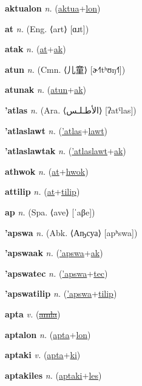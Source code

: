 \textbf{\hypertarget{aktualon}{aktualon}} \textit{n.} (\hyperlink{aktua}{aktua}+\allowbreak \hyperlink{lon}{lon})


\textbf{\hypertarget{at}{at}} \textit{n.} (Eng. ⟨art⟩ [ɑɹt])


\textbf{\hypertarget{atak}{atak}} \textit{n.} (\hyperlink{at}{at}+\allowbreak \hyperlink{ak}{ak})


\textbf{\hypertarget{atun}{atun}} \textit{n.} (Cmn. ⟨{\chinese{}儿童}⟩ [ɚ˧˥tʰʊŋ˧˥])


\textbf{\hypertarget{atunak}{atunak}} \textit{n.} (\hyperlink{atun}{atun}+\allowbreak \hyperlink{ak}{ak})


\textbf{\hypertarget{'atlas}{'atlas}} \textit{n.} (Ara. ⟨{\arabics{}الأطـلـس‎}⟩ [ʔatˤlas])


\textbf{\hypertarget{'atlaslawt}{'atlaslawt}} \textit{n.} (\hyperlink{'atlas}{'atlas}+\allowbreak \hyperlink{lawt}{lawt})


\textbf{\hypertarget{'atlaslawtak}{'atlaslawtak}} \textit{n.} (\hyperlink{'atlaslawt}{'atlaslawt}+\allowbreak \hyperlink{ak}{ak})


\textbf{\hypertarget{athwok}{athwok}} \textit{n.} (\hyperlink{at}{at}+\allowbreak \hyperlink{hwok}{hwok})


\textbf{\hypertarget{attilip}{attilip}} \textit{n.} (\hyperlink{at}{at}+\allowbreak \hyperlink{tilip}{tilip})


\textbf{\hypertarget{ap}{ap}} \textit{n.} (Spa. ⟨ave⟩ [ˈaβe])


\textbf{\hypertarget{'apswa}{'apswa}} \textit{n.} (Abk. ⟨Аҧсуа⟩ [apʰswa])


\textbf{\hypertarget{'apswaak}{'apswaak}} \textit{n.} (\hyperlink{'apswa}{'apswa}+\allowbreak \hyperlink{ak}{ak})


\textbf{\hypertarget{'apswatec}{'apswatec}} \textit{n.} (\hyperlink{'apswa}{'apswa}+\allowbreak \hyperlink{tec}{tec})


\textbf{\hypertarget{'apswatilip}{'apswatilip}} \textit{n.} (\hyperlink{'apswa}{'apswa}+\allowbreak \hyperlink{tilip}{tilip})


\textbf{\hypertarget{apta}{apta}} \textit{v.} (\hyperlink{amla}{\sout{amla}})


\textbf{\hypertarget{aptalon}{aptalon}} \textit{n.} (\hyperlink{apta}{apta}+\allowbreak \hyperlink{lon}{lon})


\textbf{\hypertarget{aptaki}{aptaki}} \textit{v.} (\hyperlink{apta}{apta}+\allowbreak \hyperlink{ki}{ki})


\textbf{\hypertarget{aptakiles}{aptakiles}} \textit{n.} (\hyperlink{aptaki}{aptaki}+\allowbreak \hyperlink{les}{les})


